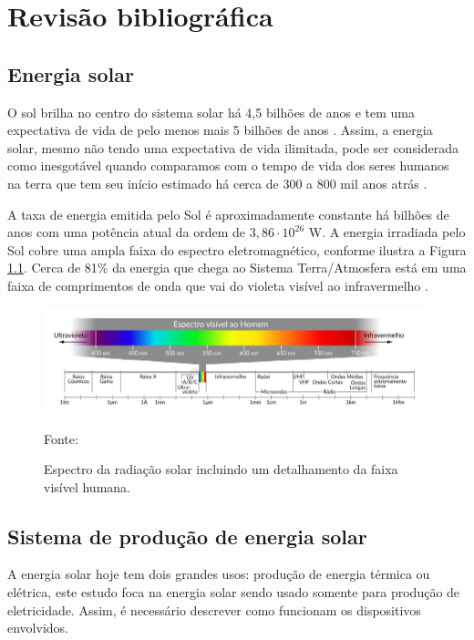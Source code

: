 \chapter{Revisão bibliográfica}

\section{Energia solar}\label{revisao_energia_solar}

O sol brilha no centro do sistema solar há 4,5 bilhões de anos e tem uma expectativa de vida de pelo menos mais 5 bilhões de anos \cite{nasa_sol}. Assim, a energia solar, mesmo não tendo uma expectativa de vida ilimitada, pode ser considerada como inesgotável quando comparamos com o tempo de vida dos seres humanos na terra que tem seu início estimado há cerca de 300 a 800 mil anos atrás \cite{wikipedia_human}.

A taxa de energia emitida pelo Sol é aproximadamente constante há bilhões de anos com uma potência atual da ordem de $3,86 \cdot 10^{26}$ W. A energia irradiada pelo Sol cobre uma ampla faixa do espectro eletromagnético, conforme ilustra a Figura \ref{fig:irrad_solar}. Cerca de 81\% da energia que chega ao Sistema Terra/Atmosfera está em uma faixa de comprimentos de onda que vai do violeta visível ao infravermelho \cite{atlas2017}.

\begin{figure}[H]
    \centering
    \includegraphics[width=0.985\textwidth]{./Figuras/irrad_solar.png}
    \caption{Espectro da radiação solar incluindo um detalhamento da faixa visível humana.}{Fonte: \cite{atlas2017}}
   \label{fig:irrad_solar}
\end{figure}

\newpage
\section{Sistema de produção de energia solar}

A energia solar hoje tem dois grandes usos: produção de energia térmica ou elétrica, este estudo foca na energia solar sendo usado somente para produção de eletricidade. Assim, é necessário descrever como funcionam os dispositivos envolvidos.


